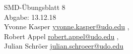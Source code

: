 


\begin{center}
{\huge SMD-Übungsblatt 8} \\
\vspace{1cm}
Abgabe: 13.12.18 \\
\vspace{.5cm}
  Yvonne Kasper
  \texorpdfstring{
    \href{mailto:authorA@udo.edu}{yvonne.kasper@udo.edu}
  }{},\\
  Robert Appel%
  \texorpdfstring{
    \href{mailto:authorB@udo.edu}{robert.appel@udo.edu}
  }{},\\
  Julian Schröer%
  \texorpdfstring{
    \href{mailto:authorB@udo.edu}{julian.schroeer@udo.edu}
  }{}
\end{center}





\printbibliography


